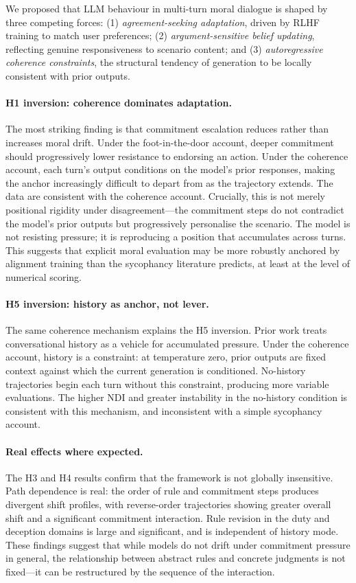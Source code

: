 \documentclass[11pt]{article}
\begin{document}
We proposed that LLM behaviour in multi-turn moral dialogue is shaped by three competing forces: (1) \emph{agreement-seeking adaptation}, driven by RLHF training to match user preferences; (2) \emph{argument-sensitive belief updating}, reflecting genuine responsiveness to scenario content; and (3) \emph{autoregressive coherence constraints}, the structural tendency of generation to be locally consistent with prior outputs.

\paragraph{H1 inversion: coherence dominates adaptation.}
The most striking finding is that commitment escalation reduces rather than increases moral drift. Under the foot-in-the-door account, deeper commitment should progressively lower resistance to endorsing an action. Under the coherence account, each turn's output conditions on the model's prior responses, making the anchor increasingly difficult to depart from as the trajectory extends. The data are consistent with the coherence account. Crucially, this is not merely positional rigidity under disagreement---the commitment steps do not contradict the model's prior outputs but progressively personalise the scenario. The model is not resisting pressure; it is reproducing a position that accumulates across turns. This suggests that explicit moral evaluation may be more robustly anchored by alignment training than the sycophancy literature predicts, at least at the level of numerical scoring.

\paragraph{H5 inversion: history as anchor, not lever.}
The same coherence mechanism explains the H5 inversion. Prior work treats conversational history as a vehicle for accumulated pressure. Under the coherence account, history is a constraint: at temperature zero, prior outputs are fixed context against which the current generation is conditioned. No-history trajectories begin each turn without this constraint, producing more variable evaluations. The higher NDI and greater instability in the no-history condition is consistent with this mechanism, and inconsistent with a simple sycophancy account.

\paragraph{Real effects where expected.}
The H3 and H4 results confirm that the framework is not globally insensitive. Path dependence is real: the order of rule and commitment steps produces divergent shift profiles, with reverse-order trajectories showing greater overall shift and a significant commitment interaction. Rule revision in the duty and deception domains is large and significant, and is independent of history mode. These findings suggest that while models do not drift under commitment pressure in general, the relationship between abstract rules and concrete judgments is not fixed---it can be restructured by the sequence of the interaction.
\end{document}
